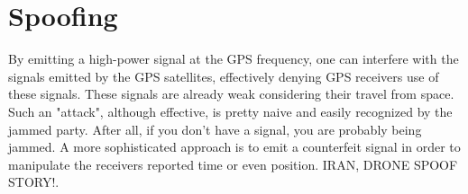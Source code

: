 \documentclass[12pt,english,a4paper]{article}
\begin{document}
\section{Spoofing}
By emitting a high-power signal at the GPS frequency, one can interfere with the signals emitted by the GPS satellites, effectively denying GPS receivers use of these signals. These signals are already weak considering their travel from space. Such an "attack", although effective, is pretty naive and easily recognized by the jammed party. After all, if you don't have a signal, you are probably being jammed. A more sophisticated approach is to emit a counterfeit signal in order to manipulate the receivers reported time or even position. IRAN, DRONE SPOOF STORY!. 


\newpage
\printbibliography[title={Complete Bibliography},heading=bibintoc]
\end{document}

